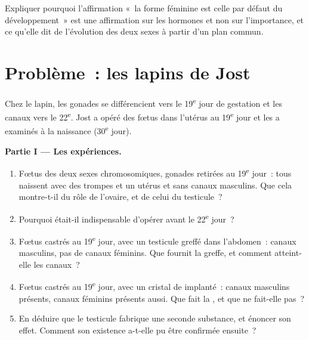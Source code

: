 \begin{exercise}[$\star\star\star$]\label{exo:g11:becoming-male-female:15}
Expliquer pourquoi l'affirmation «~la forme féminine est celle par
défaut du développement~» est une affirmation sur les hormones et non
sur l'importance, et ce qu'elle dit de l'évolution des deux sexes à
partir d'un plan commun.
\end{exercise}

\section{Problème~: les lapins de Jost}

\begin{problem}
\label{pb:g11:becoming-male-female:1}
Chez le lapin, les gonades se différencient vers le 19\textsuperscript{e}
jour de gestation et les canaux vers le 22\textsuperscript{e}. Jost a
opéré des fœtus dans l'utérus au 19\textsuperscript{e} jour et les a
examinés à la naissance (30\textsuperscript{e} jour).

\medskip
\noindent\textbf{Partie I --- Les expériences.}
\begin{enumerate}
  \item Fœtus des deux sexes chromosomiques, gonades retirées au
        19\textsuperscript{e} jour~: tous naissent avec des trompes et
        un utérus et sans canaux masculins. Que cela montre-t-il du
        rôle de l'ovaire, et de celui du testicule~?
  \item Pourquoi était-il indispensable d'opérer avant le
        22\textsuperscript{e} jour~?
  \item Fœtus castrés au 19\textsuperscript{e} jour, avec un
        testicule greffé dans l'abdomen~: canaux masculins, pas de
        canaux féminins. Que fournit la greffe, et comment atteint-elle
        les canaux~?
  \item Fœtus castrés au 19\textsuperscript{e} jour, avec un cristal
        de  implanté~: canaux masculins présents, canaux
        féminins présents aussi. Que fait la , et que ne
        fait-elle pas~?
  \item En déduire que le testicule fabrique une seconde substance, et
        énoncer son effet. Comment son existence a-t-elle pu être
        confirmée ensuite~?
\end{enumerate}


\end{problem}

